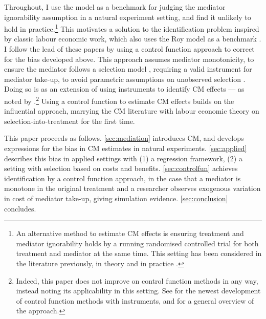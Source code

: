 Throughout, I use the \cite{roy1951some} model as a benchmark for judging the \cite{imai2010identification} mediator ignorability assumption in a natural experiment setting, and find it unlikely to hold in practice.\footnote{
    An alternative method to estimate CM effects is ensuring treatment and mediator ignorability holds by a running randomised controlled trial for both treatment and mediator at the same time.
    This setting has been considered in the literature previously, in theory \citep{imai2013experimental} and in practice \citep{ludwig2011mechanism}.
}
This motivates a solution to the identification problem inspired by classic labour economic work, which also uses the Roy model as a benchmark \citep{heckman1979sample,heckman1990empirical}.
I follow the lead of these papers by using a control function approach to correct for the bias developed above.
This approach assumes mediator monotonicity, to ensure the mediator follows a selection model \citep{vytlacil2002independence}, requiring a valid instrument for mediator take-up, to avoid parametric assumptions on unobserved selection \citep{heckman2004using,florens2008identification}.
Doing so is as an extension of using instruments to identify CM effects --- as noted by \cite{frolich2017direct}.\footnote{
    Indeed, this paper does not improve on control function methods in any way, instead noting its applicability in this setting.
    See \cite{frolich2017direct} for the newest development of control function methods with instruments, and \cite{imbens2007nonadditive} for a general overview of the approach.
}
Using a control function to estimate CM effects builds on the influential \cite{imai2010identification} approach, marrying the CM literature with labour economic theory on selection-into-treatment for the first time. 

This paper proceeds as follows.
\autoref{sec:mediation} introduces CM, and develops expressions for the bias in CM estimates in natural experiments.
\autoref{sec:applied} describes this bias in applied settings with (1) a regression framework, (2) a setting with selection based on costs and benefits.
\autoref{sec:controlfun} achieves identification by a control function approach,
in the case that a mediator is monotone in the original treatment and a researcher observes exogenous variation in cost of mediator take-up, giving simulation evidence.
\autoref{sec:conclusion} concludes.
